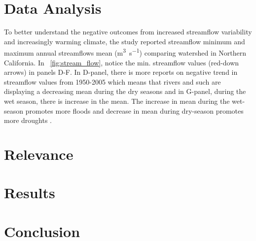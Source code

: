 \documentclass[a4paper,man,biblatex]{apa6}
\begin{document}
\section{Data Analysis} 
\medskip
\par To better understand the negative outcomes from increased streamflow variability and increasingly warming climate, the \textcite{mallakpour_2018} study reported streamflow minimum and maximum annual streamflows mean (\si{\cubic\meter\per\second}) comparing watershed in Northern California. In ~\ref{fig:stream_flow}, notice the min. streamflow values (red-down arrows) in panels D-F. In D-panel, there is more reports on negative trend in streamflow values from 1950-2005 which means that rivers and such are displaying a decreasing mean during the dry seasons and in G-panel, during the wet season, there is increase in the mean. The increase in mean during the wet-season promotes more floods and decrease in mean during dry-season promotes more droughts \autocite{mallakpour_2018}.
\section{Relevance} 

\section{Results} 

\section{Conclusion}  

\printbibliography
\end{document}
